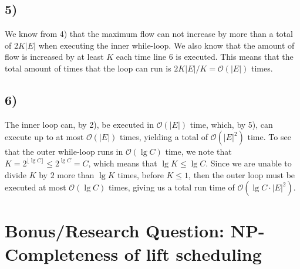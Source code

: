 \documentclass[a4paper]{article}
\begin{document}
\subsection*{5)}
We know from 4) that the maximum flow can not increase by more than a total of $2K|E|$ when executing the inner while-loop. We also know that the amount of flow is increased by at least $K$ each time line 6 is executed. This means that the total amount of times that the loop can run is $2K|E|/K=\mathcal{O}(|E|)$ times.
\subsection*{6)}
The inner loop can, by 2), be executed in $\mathcal{O}(|E|)$ time, which, by 5), can execute up to at most $\mathcal{O}(|E|)$ times, yielding a total of $\mathcal{O}(|E|^2)$ time. To see that the outer while-loop runs in $\mathcal{O}(\lg C)$ time, we note that $K = 2^{\lfloor \lg C \rfloor} \leq 2^{\lg C}=C$, which means that $\lg K \leq \lg C$. Since we are unable to divide $K$ by $2$ more than $\lg K$ times, before $K\leq 1$, then the outer loop must be executed at most
$\mathcal{O}(\lg C)$ times, giving us a total run time of $\mathcal{O}(\lg C \cdot |E|^2)$.
\section{Bonus/Research Question: NP-Completeness of lift scheduling}
\end{document}
